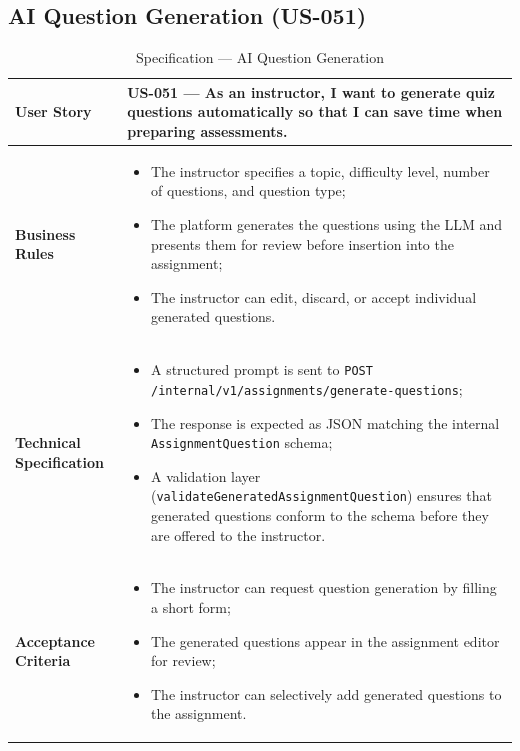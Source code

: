 \subsection{AI Question Generation (US-051)}

\begin{table}[H]
\centering
\caption{Specification — AI Question Generation}
\label{tab:qgen_spec}
\renewcommand{\arraystretch}{1.2}
\begin{tabularx}{\textwidth}{|p{3.5cm}|X|}
\hline
\textbf{User Story} & US-051 — As an instructor, I want to generate quiz questions automatically so that I can save time when preparing assessments. \\
\hline
\textbf{Business Rules} &
\begin{itemize}[noitemsep, topsep=2pt]
  \item The instructor specifies a topic, difficulty level, number of questions, and
        question type;
  \item The platform generates the questions using the LLM and presents them for review
        before insertion into the assignment;
  \item The instructor can edit, discard, or accept individual generated questions.
\end{itemize} \\
\hline
\textbf{Technical Specification} &
\begin{itemize}[noitemsep, topsep=2pt]
  \item A structured prompt is sent to
        \texttt{POST /internal/v1/assignments/generate-questions};
  \item The response is expected as JSON matching the internal
        \texttt{AssignmentQuestion} schema;
  \item A validation layer (\texttt{validateGeneratedAssignmentQuestion}) ensures that
        generated questions conform to the schema before they are offered to the instructor.
\end{itemize} \\
\hline
\textbf{Acceptance Criteria} &
\begin{itemize}[noitemsep, topsep=2pt]
  \item The instructor can request question generation by filling a short form;
  \item The generated questions appear in the assignment editor for review;
  \item The instructor can selectively add generated questions to the assignment.
\end{itemize} \\
\hline
\end{tabularx}
\end{table}

